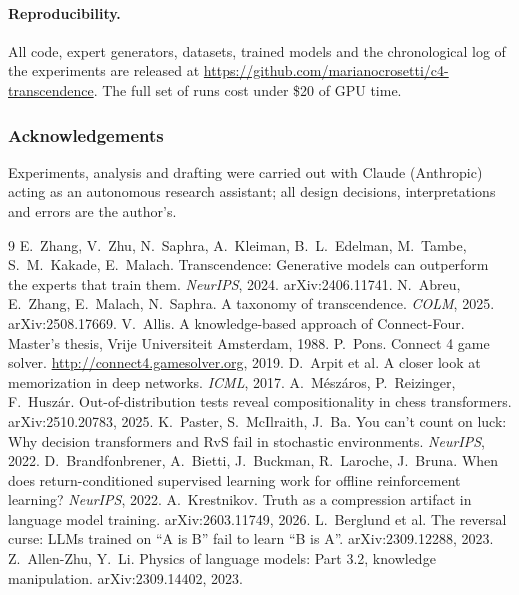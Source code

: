 \documentclass[11pt]{article}
\begin{document}
\paragraph{Reproducibility.} All code, expert generators, datasets, trained models and the chronological log of the experiments are released at \url{https://github.com/marianocrosetti/c4-transcendence}\sloppy{}. The full set of runs cost under \$20 of GPU time.

\subsubsection*{Acknowledgements}
Experiments, analysis and drafting were carried out with Claude (Anthropic) acting as an autonomous research assistant; all design decisions, interpretations and errors are the author's.

\begin{thebibliography}{9}
\small
{} E.~Zhang, V.~Zhu, N.~Saphra, A.~Kleiman, B.~L.~Edelman, M.~Tambe, S.~M.~Kakade, E.~Malach. Transcendence: Generative models can outperform the experts that train them. \emph{NeurIPS}, 2024. arXiv:2406.11741.
 N.~Abreu, E.~Zhang, E.~Malach, N.~Saphra. A taxonomy of transcendence. \emph{COLM}, 2025. arXiv:2508.17669.
 V.~Allis. A knowledge-based approach of Connect-Four. Master's thesis, Vrije Universiteit Amsterdam, 1988.
 P.~Pons. Connect 4 game solver. \url{http://connect4.gamesolver.org}, 2019.
 D.~Arpit et al. A closer look at memorization in deep networks. \emph{ICML}, 2017.
 A.~M\'esz\'aros, P.~Reizinger, F.~Husz\'ar. Out-of-distribution tests reveal compositionality in chess transformers. arXiv:2510.20783, 2025.
 K.~Paster, S.~McIlraith, J.~Ba. You can't count on luck: Why decision transformers and RvS fail in stochastic environments. \emph{NeurIPS}, 2022.
 D.~Brandfonbrener, A.~Bietti, J.~Buckman, R.~Laroche, J.~Bruna. When does return-conditioned supervised learning work for offline reinforcement learning? \emph{NeurIPS}, 2022.
 A.~Krestnikov. Truth as a compression artifact in language model training. arXiv:2603.11749, 2026.
 L.~Berglund et al. The reversal curse: LLMs trained on ``A is B'' fail to learn ``B is A''. arXiv:2309.12288, 2023.
 Z.~Allen-Zhu, Y.~Li. Physics of language models: Part 3.2, knowledge manipulation. arXiv:2309.14402, 2023.
\end{thebibliography}
\end{document}
